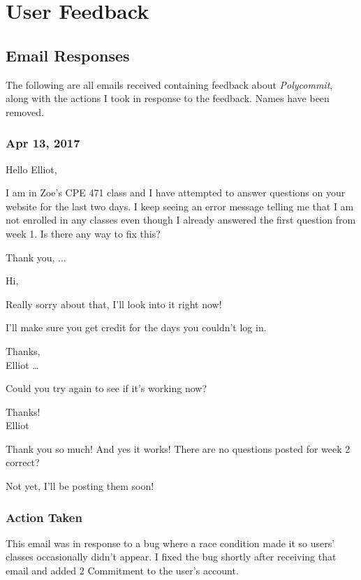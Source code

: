 \chapter{User Feedback}

\section{Email Responses}
\label{appendix:emails}

\par The following are all emails received containing feedback about \textit{Polycommit}, along with the actions I took in response to the feedback. Names have been removed.

\subsection{Apr 13, 2017}

{\fontsize{12pt}{8pt}\selectfont
Hello Elliot,

I am in Zoe's CPE 471 class and I have attempted to answer questions on your website for the last two days. I keep seeing an error message telling me that I am not enrolled in any classes even though I already answered the first question from week 1. Is there any way to fix this?

Thank you,
   ...
   
   \vspace{1.0cm}
   
Hi,

Really sorry about that, I'll look into it right now!

I'll make sure you get credit for the days you couldn't log in.

Thanks, \\
\-\hspace{2cm}Elliot
…
 
   \vspace{2.0cm}
   
Could you try again to see if it's working now?

Thanks! \\
\-\hspace{2cm}Elliot
 
 
   \vspace{2.0cm}
   
Thank you so much! And yes it works! There are no questions posted for week 2 correct? 


   \vspace{2.0cm}
   
Not yet, I'll be posting them soon!

\subsection{Action Taken}
\par This email was in response to a bug where a race condition made it so users' classes occasionally didn't appear. I fixed the bug shortly after receiving that email and added 2 Commitment to the user's account.
}
